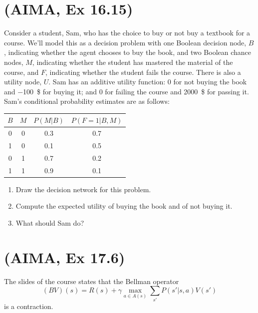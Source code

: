 \documentclass[11pt, a4paper]{article}
\begin{document}
\newpage

\section{(AIMA, Ex 16.15)}

Consider a student, Sam, who has the choice to buy or not buy a textbook for a course. We'll model this as a decision problem with one Boolean decision node, $B$, indicating whether the agent chooses to buy the book, and two Boolean chance nodes,
$M$, indicating whether the student has mastered the material of the course, and $F$, indicating whether the student fails the course. There is also a utility node, $U$. Sam has an additive utility function: 0 for not buying the book and \qty{-100}{\$} for buying it; and 0 for failing the course and \qty{2000}{\$} for passing it. Sam's conditional probability estimates are as follows:

\begin{table}[h]
    \centering
    \begin{tabular}{cc|cc}
        \toprule
        $B$ & $M$ & $P(M | B)$ & $P(F = 1 | B, M)$ \\
        \midrule
        0 & 0 & 0.3 & 0.7 \\
        1 & 0 & 0.1 & 0.5 \\
        0 & 1 & 0.7 & 0.2 \\
        1 & 1 & 0.9 & 0.1 \\
        \bottomrule
    \end{tabular}
\end{table}

\begin{enumerate}
    \item Draw the decision network for this problem.

    \item Compute the expected utility of buying the book and of not buying it.

    \item What should Sam do?
\end{enumerate}

\newpage

\section{(AIMA, Ex 17.6)}

The slides of the course states that the Bellman operator
\begin{equation*}
    (B V)(s) = R(s) + \gamma \max_{a \in A(s)} \sum_{s'} P(s' | s, a) V(s')
\end{equation*}
is a contraction.
\end{document}
